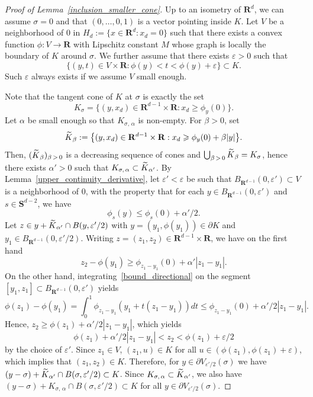 \documentclass[AHL,Unicode,longabstracts,published]{cedram}
\newcommand{\bfS}{\mathbf{S}}
\newcommand{\bfR}{\mathbf{R}}
\renewcommand{\epsilon}{\varepsilon}
\renewcommand{\leq}{\leqslant}
\renewcommand{\geq}{\geqslant}
\let\oldtilde\tilde
\renewcommand*{\tilde}[1]{\mathchoice{\widetilde{#1}}{\widetilde{#1}}{\oldtilde{#1}}{\oldtilde{#1}}}
\begin{document}
\begin{proof}[Proof of Lemma~\ref{inclusion_smaller_cone}]
Up to an isometry of $\bfR^{d}$, we can assume $\sigma=0$ and that $(0,\ldots,0,1)$ is a vector pointing inside $K$. Let $V$ be a neighborhood of $0$ in $H_{d}:=\{ x\in \bfR^{d}:x_{d}=0\}$ such that there exists a convex function $\phi : V\rightarrow \bfR$ with Lipschitz constant $M$ whose graph is locally the boundary of $K$ around $\sigma$. We further assume that there exists $\epsilon>0$ such that
\[
\big\{ (y,t)\in V\times \bfR:\phi(y)<t<\phi(y)+\epsilon\big\} \subset K.
\]
Such $\epsilon$ always exists if we assume $V$ small enough.

Note that the tangent cone of $K$ at $\sigma$ is exactly the set
\[
K_{\sigma}=\big\{ (y,x_{d})\in \bfR^{d-1}\times \bfR: x_{d}\geq \phi_{y}(0)\big\}.
\]
Let $\alpha$ be small enough so that $K_{\sigma,\,\alpha}$ is non-empty. For $\beta>0$, set
\[
\tilde{K}_{\beta}:=\big\{ (y,x_{d})\in \bfR^{d-1}\times \bfR: x_{d}\geq \phi_{y}(0)+\beta| y|\big\}.
\]
Then, $(\tilde{K}_{\beta})_{\beta\,>\,0}$ is a decreasing sequence of cones and $\bigcup_{\beta\,>\,0} \tilde{K}_{\beta}=K_{\sigma}$, hence there exists $\alpha'>0$ such that $K_{\sigma,\,\alpha}\subset \tilde{K}_{\alpha'}$. By Lemma~\ref{upper_continuity_derivative}, let $\epsilon'<\epsilon$ be such that $B_{\bfR^{d-1}}(0,\epsilon')\subset V$ is a neighborhood of $0$, with the property that for each $y\in B_{\bfR^{d-1}}(0,\epsilon')$ and $s\in\bfS^{d-2}$, we have
\begin{equation}\label{bound_directional}
\phi_{s}(y)\leq \phi_{s}(0)+\alpha'/2.
\end{equation}
Let $z\in y+\tilde{K}_{\alpha'}\cap B(y,\epsilon'/2)$ with $y=(y_{1},\phi(y_{1}))\in\partial K$ and $y_{1}\in B_{\bfR^{d-1}}(0,\epsilon'/2)$. Writing $z=(z_{1},z_{2})\in \bfR^{d-1}\times \bfR$, we have on the first hand
\[
z_{2}-\phi(y_{1})\geq \phi_{z_{1}-y_{1}}(0)+\alpha'|z_{1}-y_{1}|.
\]
On the other hand, integrating~\eqref{bound_directional} on the segment $[y_{1},z_{1}]\subset B_{\bfR^{d-1}}(0,\epsilon')$ yields
\[
\phi(z_{1})-\phi(y_{1})=\int_{0}^{1}\phi_{z_{1}-y_{1}}\left(y_{1}+t(z_{1}-y_{1})\right)dt
\leq \phi_{z_{1}-y_{1}}(0)+\alpha'/2|z_{1}-y_{1}|.
\]
Hence, $z_{2}\geq \phi(z_{1})+\alpha'/2| z_{1}-y_{1}|$, which yields
\begin{equation}\label{minimum_slope}
\phi(z_{1})+\alpha'/2|z_{1}-y_{1}|<z_{2}<\phi(z_{1})+\epsilon/2
\end{equation}
by the choice of $\epsilon'$. Since $z_{1}\in V$, $(z_{1},u)\in K$ for all $u\in (\phi(z_{1}),\phi(z_{1})+\epsilon)$, which implies that $(z_{1},z_{2})\in K$. Therefore, for $y\in \partial V_{\epsilon'/2}(\sigma)$ we have $(y-\sigma)+\tilde{K}_{\alpha'}\cap B(\sigma,\epsilon'/2)\subset K$. Since $K_{\sigma,\,\alpha}\subset\tilde{K}_{\alpha'}$, we also have $(y-\sigma)+K_{\sigma,\,\alpha}\cap B(\sigma,\epsilon'/2)\subset K$ for all $y\in \partial V_{\epsilon'/2}(\sigma)$.


\end{proof}
\end{document}
